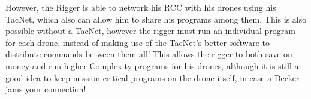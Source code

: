 \begin{multicols*}{3}
	However, the Rigger is able to network his RCC with his drones using his TacNet, which also can allow him to share his programs among them. This is also possible without a TacNet, however the rigger must run an individual program for each drone, instead of making use of the TacNet's better software to distribute commands between them all! This allows the rigger to both save on money and run higher Complexity programs for his drones, although it is still a good idea to keep mission critical programs on the drone itself, in case a Decker jams your connection!
	
	
\end{multicols*}